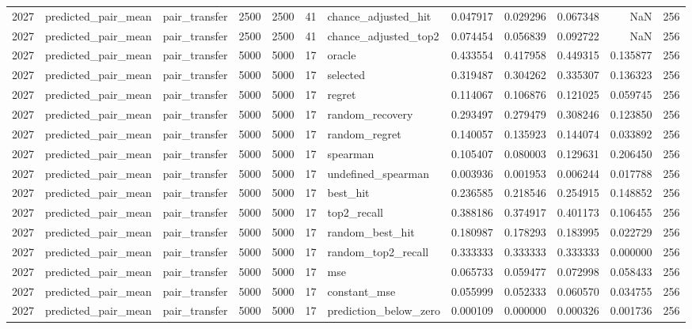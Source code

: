 \begin{tabular}{rllrrrlrrrrr}
2027 & predicted_pair_mean & pair_transfer & 2500 & 2500 & 41 & chance_adjusted_hit & 0.047917 & 0.029296 & 0.067348 & NaN & 256 \\
2027 & predicted_pair_mean & pair_transfer & 2500 & 2500 & 41 & chance_adjusted_top2 & 0.074454 & 0.056839 & 0.092722 & NaN & 256 \\
2027 & predicted_pair_mean & pair_transfer & 5000 & 5000 & 17 & oracle & 0.433554 & 0.417958 & 0.449315 & 0.135877 & 256 \\
2027 & predicted_pair_mean & pair_transfer & 5000 & 5000 & 17 & selected & 0.319487 & 0.304262 & 0.335307 & 0.136323 & 256 \\
2027 & predicted_pair_mean & pair_transfer & 5000 & 5000 & 17 & regret & 0.114067 & 0.106876 & 0.121025 & 0.059745 & 256 \\
2027 & predicted_pair_mean & pair_transfer & 5000 & 5000 & 17 & random_recovery & 0.293497 & 0.279479 & 0.308246 & 0.123850 & 256 \\
2027 & predicted_pair_mean & pair_transfer & 5000 & 5000 & 17 & random_regret & 0.140057 & 0.135923 & 0.144074 & 0.033892 & 256 \\
2027 & predicted_pair_mean & pair_transfer & 5000 & 5000 & 17 & spearman & 0.105407 & 0.080003 & 0.129631 & 0.206450 & 256 \\
2027 & predicted_pair_mean & pair_transfer & 5000 & 5000 & 17 & undefined_spearman & 0.003936 & 0.001953 & 0.006244 & 0.017788 & 256 \\
2027 & predicted_pair_mean & pair_transfer & 5000 & 5000 & 17 & best_hit & 0.236585 & 0.218546 & 0.254915 & 0.148852 & 256 \\
2027 & predicted_pair_mean & pair_transfer & 5000 & 5000 & 17 & top2_recall & 0.388186 & 0.374917 & 0.401173 & 0.106455 & 256 \\
2027 & predicted_pair_mean & pair_transfer & 5000 & 5000 & 17 & random_best_hit & 0.180987 & 0.178293 & 0.183995 & 0.022729 & 256 \\
2027 & predicted_pair_mean & pair_transfer & 5000 & 5000 & 17 & random_top2_recall & 0.333333 & 0.333333 & 0.333333 & 0.000000 & 256 \\
2027 & predicted_pair_mean & pair_transfer & 5000 & 5000 & 17 & mse & 0.065733 & 0.059477 & 0.072998 & 0.058433 & 256 \\
2027 & predicted_pair_mean & pair_transfer & 5000 & 5000 & 17 & constant_mse & 0.055999 & 0.052333 & 0.060570 & 0.034755 & 256 \\
2027 & predicted_pair_mean & pair_transfer & 5000 & 5000 & 17 & prediction_below_zero & 0.000109 & 0.000000 & 0.000326 & 0.001736 & 256 \\

\end{tabular}
